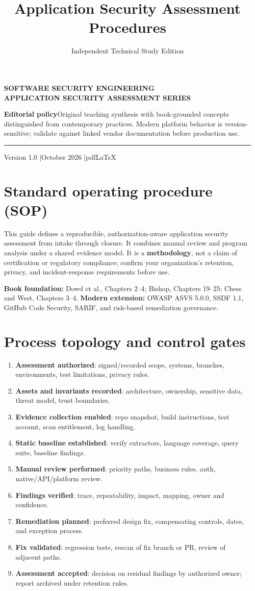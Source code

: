 \documentclass[
  letterpaper,
]{article}
\title{Application Security Assessment Procedures}
\author{Independent Technical Study Edition}
\date{}
\makeatletter
\providecommand{\tightlist}{%
  \setlength{\itemsep}{0pt}\setlength{\parskip}{0pt}}
\renewcommand{\maketitle}{%
 \hypersetup{pageanchor=false}%
\begin{titlepage}\thispagestyle{empty}
 \vspace*{1.5cm}{\color{brand}\rule{\textwidth}{3pt}}\par\vspace{1cm}
 {\sffamily\bfseries\color{muted}\large SOFTWARE SECURITY ENGINEERING\\ APPLICATION SECURITY ASSESSMENT SERIES}\par\vspace{1.05cm}
 {\sffamily\bfseries\color{ink}\fontsize{27}{34}\selectfont\@title\par}\vspace{0.8cm}
 {\sffamily\large\color{brand}\@author\par}\vfill
 \begin{tcolorbox}[colback=brandlight,colframe=brand!55,boxrule=0.5pt]
 \small\textbf{Editorial policy}\quad Original teaching synthesis with book-grounded concepts distinguished from contemporary practices. Modern platform behavior is version-sensitive; validate against linked vendor documentation before production use.
 \end{tcolorbox}
 {\color{brand}\rule{\textwidth}{2pt}}\par\vspace{0.3cm}
 {\sffamily\small Version 1.0 \quad|\quad October 2026 \quad|\quad pdfLaTeX}\end{titlepage}\hypersetup{pageanchor=true}\setcounter{page}{1}}
\makeatother
\begin{document}
\maketitle

{
\setcounter{tocdepth}{3}
\tableofcontents
}
\section{Standard operating procedure
(SOP)}\label{standard-operating-procedure-sop}

This guide defines a reproducible, authorization-aware application
security assessment from intake through closure. It combines manual
review and program analysis under a shared evidence model. It is a
\textbf{methodology}, not a claim of certification or regulatory
compliance; confirm your organization's retention, privacy, and
incident-response requirements before use.

\textbf{Book foundation:} Dowd et al., Chapters 2--4; Bishop, Chapters
19--25; Chess and West, Chapters 3--4. \textbf{Modern extension:} OWASP
ASVS 5.0.0, SSDF 1.1, GitHub Code Security, SARIF, and risk-based
remediation governance.

\section{Process topology and control
gates}\label{process-topology-and-control-gates}

\begin{enumerate}
\def\labelenumi{\arabic{enumi}.}
\tightlist
\item
  \textbf{Assessment authorized}: signed/recorded scope, systems,
  branches, environments, test limitations, privacy rules.
\item
  \textbf{Assets and invariants recorded}: architecture, ownership,
  sensitive data, threat model, trust boundaries.
\item
  \textbf{Evidence collection enabled}: repo snapshot, build
  instructions, test account, scan entitlement, log handling.
\item
  \textbf{Static baseline established}: verify extractors, language
  coverage, query suite, baseline findings.
\item
  \textbf{Manual review performed}: priority paths, business rules,
  auth, native/API/platform review.
\item
  \textbf{Findings verified}: trace, repeatability, impact, mapping,
  owner and confidence.
\item
  \textbf{Remediation planned}: preferred design fix, compensating
  controls, dates, and exception process.
\item
  \textbf{Fix validated}: regression tests, rescan of fix branch or PR,
  review of adjacent paths.
\item
  \textbf{Assessment accepted}: decision on residual findings by
  authorized owner; report archived under retention rules.
\end{enumerate}
\end{document}
